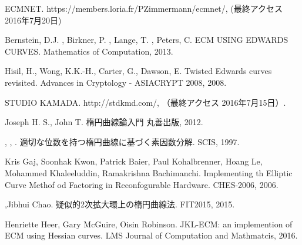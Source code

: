 \documentclass[openany,11pt,papersize]{jsbook}
\begin{document}

\begin{thebibliography}{9}

\newblock ECMNET.
\newblock https://members.loria.fr/PZimmermann/ecmnet/, (最終アクセス 2016年7月20日)

\newblock Bernstein, D.J. , Birkner, P. , Lange, T. , Peters, C.
\newblock ECM USING EDWARDS CURVES.
\newblock Mathematics of Computation, 2013.

\newblock Hisil, H., Wong, K.K.-H., Carter, G., Dawson, E.
\newblock Twisted Edwards curves revisited.
\newblock Advances in Cryptology - ASIACRYPT 2008, 2008.

\newblock STUDIO KAMADA. 
\newblock http://stdkmd.com/, （最終アクセス 2016年7月15日）.

\newblock Joseph H. S., John T.
\newblock 楕円曲線論入門
\newblock 丸善出版, 2012.

{}{},
 {}{},
 {}{}.
\newblock 適切な位数を持つ楕円曲線に基づく素因数分解.
\newblock SCIS, 1997.


\newblock Kris Gaj, Soonhak Kwon, Patrick Baier, Paul Kohalbrenner, Hoang Le, Mohammed Khaleeluddin, Ramakrishna Bachimanchi.
\newblock Implementing th Elliptic Curve Methof od Factoring in Reconfogurable Hardware.
\newblock CHES-2006, 2006.

,Jibhui Chao.
\newblock 疑似的2次拡大環上の楕円曲線法.
\newblock FIT2015, 2015.

\newblock Henriette Heer, Gary McGuire, Oisin Robinson.
\newblock JKL-ECM: an implemention of ECM using Hessian curves.
\newblock LMS Journal of Computation and Mathmatcis, 2016.

\end{thebibliography}
\end{document}
